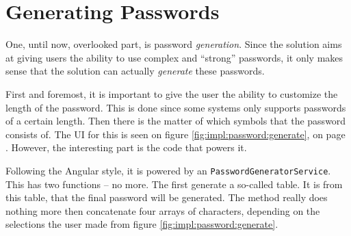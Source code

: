 




	\section{Generating Passwords}
		One, until now, overlooked part, is password \emph{generation}. Since the solution aims at giving users the ability to use complex and ``strong'' passwords, it only makes sense that the solution can actually \emph{generate} these passwords.

		First and foremost, it is important to give the user the ability to customize the length of the password. This is done since some systems only supports passwords of a certain length. Then there is the matter of which symbols that the password consists of. The UI for this is seen on figure \ref{fig:impl:password:generate}, on page \pageref{fig:impl:password:generate}. However, the interesting part is the code that powers it.

		Following the Angular style, it is powered by an \verb=PasswordGeneratorService=. This has two functions -- no more. The first generate a so-called table. It is from this table, that the final password will be generated. The method really does nothing more then concatenate four arrays of characters, depending on the selections the user made from figure \ref{fig:impl:password:generate}.

